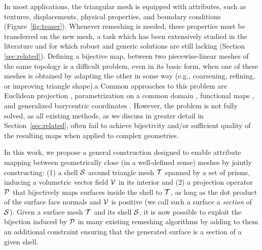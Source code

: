 In most applications, the triangular mesh is equipped with attributes, such as textures, displacements, physical properties, and boundary conditions (Figure~\ref{fig:teaser}). Whenever remeshing is needed, these properties must be transferred on the new mesh, a task which has been extensively studied in the literature and for which robust and generic solutions are still lacking (Section \ref{sec:related}). 
Defining a  bijective map,  between two   piecewise-linear meshes of the same topology is a difficult problem, even in its basic form, when one of these meshes is obtained by adapting the other in some way (e.g., coarsening, refining, or improving triangle shape).a
Common approaches to this problem are Euclidean projection
\cite{jiao2004overlaying}, parametrization on a common domain \cite{praun2001consistent,kraevoy2004cross,lee1998maps}, functional maps \cite{Ovsjanikov:2012}, and generalized barycentric coordinates \cite{Hormann:2017:GBC}.  However, the problem is not fully solved, as all existing methods, as we discuss in greater detail in Section~\ref{sec:related},
 often fail to achieve bijectivity and/or sufficient quality of the resulting maps when applied to complex geometries. %

In this work, we propose a general construction designed to enable attribute mapping between geometrically close (in a well-defined sense) meshes by jointly constructing: (1) a shell $\S$ around triangle mesh $\T$ spanned by a set of prisms, inducing a volumetric vector field $\V$ in its interior and (2) a projection operator $\P$ that bijectively maps surfaces inside the shell to $\T$, as long as the dot product of the surface face normals and $\V$ is positive
(we call such a surface a \emph{section} of $\S$).
Given a surface mesh $\T$ and its shell $\S$, it is now possible to exploit the bijection induced by $\P$ in many existing remeshing algorithms by adding to them an additional constraint ensuring that the generated surface is a section of a given shell.

